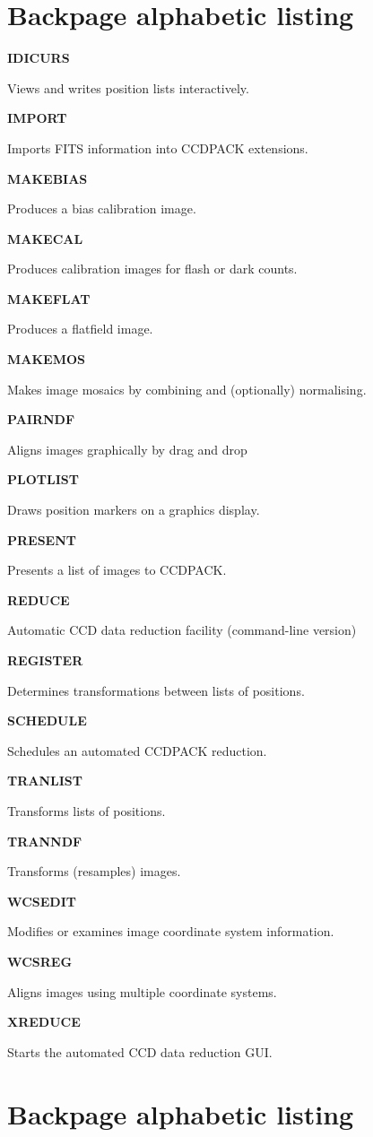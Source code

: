 \documentclass[twoside,11pt]{article}
\newenvironment{latexonly}{}{}
\renewcommand{\_}{\texttt{\symbol{95}}}
\newcommand{\quickdes}[3]{
                         \parbox{1.1in}{\bf #1}
                         \parbox{4.4in}{\raggedright #2 \dotfill}
                         \parbox{0.6in}{\pageref{#3}}
                         \vspace*{0.2in}}
\newcommand{\latexonlysection}[1]{\section{#1}}
\newcommand{\latexonlysection}[1]{#1}
\begin{document}
\begin{latexonly}

\cleardoublepage

\latexonlysection{Backpage alphabetic listing}

%
%

\quickdes{IDICURS}{Views and writes position lists interactively.}{IDICURS}

\quickdes{IMPORT}{Imports FITS information into CCDPACK extensions.}{IMPORT}

\quickdes{MAKEBIAS}{Produces a bias calibration image.}{MAKEBIAS}

\quickdes{MAKECAL}{Produces calibration images for flash or dark counts.}
                  {MAKECAL}

\quickdes{MAKEFLAT}{Produces a flatfield image.}
                   {MAKEFLAT}

\quickdes{MAKEMOS}{Makes image mosaics by combining and (optionally) 
                   normalising.}
                  {MAKEMOS}

\quickdes{PAIRNDF}{Aligns images graphically by drag and drop}{PAIRNDF}

\quickdes{PLOTLIST}{Draws position markers on a graphics display.}
                   {PLOTLIST}

\quickdes{PRESENT}{Presents a list of images to CCDPACK.}{PRESENT}

\quickdes{REDUCE}{Automatic CCD data reduction facility (command-line version)}
                 {REDUCE}

\quickdes{REGISTER}{Determines transformations between lists of positions.}
                   {REGISTER}

\quickdes{SCHEDULE}{Schedules an automated CCDPACK reduction.}{SCHEDULE}

\quickdes{TRANLIST}{Transforms lists of positions.}
                   {TRANLIST}

\quickdes{TRANNDF}{Transforms (resamples) images.}
                  {TRANNDF}

\quickdes{WCSEDIT}{Modifies or examines image coordinate system information.}
                  {WCSEDIT}

\quickdes{WCSREG}{Aligns images using multiple coordinate systems.}
                 {WCSREG}

\quickdes{XREDUCE}{Starts the automated CCD data reduction GUI.}{XREDUCE}

\newpage
\latexonlysection{Backpage alphabetic listing}


\end{latexonly}
\end{document}
